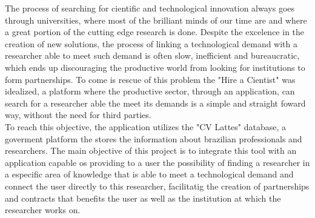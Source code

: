 \begin{abstractutfpr}
    The process of searching for cientific and technological innovation always goes through universities, where most of the brilliant minds of our time are and where a great portion of the cutting edge research is done. Despite the excelence in the creation of new solutions, the process of linking a technological demand with a researcher able to meet such demand is often slow, inefficient and bureaucratic, which ends up discouraging the productive world from looking for institutions to form partnerships. To come is rescue of this problem the "Hire a Cientist" was idealized, a platform where the productive sector, through an application, can search for a researcher able the meet its demands is a simple and straight foward way, without the need for third parties.
    \\
    To reach this objective, the application utilizes the "CV Lattes" database, a goverment platform the stores the information about brazilian professionals and researchers. The main objective of this project is to integrate this tool with an application capable os providing to a user the possibility of finding a researcher in a especific area of knowledge that is able to meet a technological demand and connect the user directly to this researcher, facilitatig the creation of partnerships and contracts that benefits the user as well as the institution at which the researcher works on.
\end{abstractutfpr}
